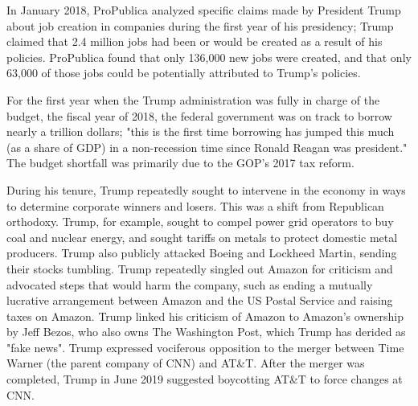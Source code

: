 In January 2018, ProPublica analyzed specific claims made by President
Trump about job creation in companies during the first year of his
presidency; Trump claimed that 2.4 million jobs had been or would be
created as a result of his policies. ProPublica found that only 136,000
new jobs were created, and that only 63,000 of those jobs could be
potentially attributed to Trump's policies.

For the first year when the Trump administration was fully in charge of
the budget, the fiscal year of 2018, the federal government was on track
to borrow nearly a trillion dollars; "this is the first time borrowing
has jumped this much (as a share of GDP) in a non-recession time since
Ronald Reagan was president." The budget shortfall was primarily due to
the GOP's 2017 tax reform.

During his tenure, Trump repeatedly sought to intervene in the economy
in ways to determine corporate winners and losers. This was a shift from
Republican orthodoxy. Trump, for example, sought to compel power grid
operators to buy coal and nuclear energy, and sought tariffs on metals
to protect domestic metal producers. Trump also publicly attacked Boeing
and Lockheed Martin, sending their stocks tumbling. Trump repeatedly
singled out Amazon for criticism and advocated steps that would harm the
company, such as ending a mutually lucrative arrangement between Amazon
and the US Postal Service and raising taxes on Amazon. Trump linked his
criticism of Amazon to Amazon's ownership by Jeff Bezos, who also owns
The Washington Post, which Trump has derided as "fake news". Trump
expressed vociferous opposition to the merger between Time Warner (the
parent company of CNN) and AT\&T. After the merger was completed, Trump
in June 2019 suggested boycotting AT\&T to force changes at CNN.

